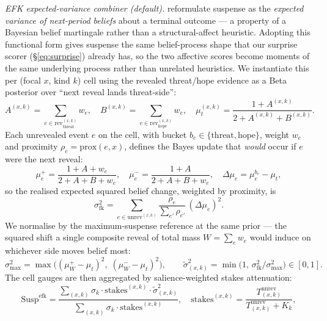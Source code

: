 \documentclass[11pt]{article}
\begin{document}
\emph{EFK expected-variance combiner (default).}
\citet{elyfrankel2015suspense} reformulate suspense as the
\emph{expected variance of next-period beliefs} about a terminal
outcome --- a property of a Bayesian belief martingale rather than a
structural-affect heuristic. Adopting this functional form
gives suspense the same belief-process shape that our surprise
scorer (\S\ref{eq:surprise}) already has, so the two affective
scores become moments of the same underlying process rather than
unrelated heuristics. We instantiate this per (focal $x$, kind
$k$) cell using the revealed threat/hope evidence as a Beta
posterior over ``next reveal lands threat-side'':
\begin{equation}
A^{(x,k)} = \!\!\sum_{e\in\mathrm{rev}^{(x,k)}_{\mathrm{threat}}}\!\! w_e, \quad
B^{(x,k)} = \!\!\sum_{e\in\mathrm{rev}^{(x,k)}_{\mathrm{hope}}}\!\! w_e, \quad
\mu_t^{(x,k)} = \frac{1+A^{(x,k)}}{2+A^{(x,k)}+B^{(x,k)}}.
\end{equation}
Each unrevealed event $e$ on the cell, with bucket
$b_e\in\{\mathrm{threat},\mathrm{hope}\}$, weight $w_e$ and
proximity $\rho_e=\mathrm{prox}(e,x)$, defines the Bayes update
that \emph{would} occur if $e$ were the next reveal:
\begin{equation}
\mu_e^+ = \frac{1+A+w_e}{2+A+B+w_e}, \quad
\mu_e^- = \frac{1+A}{2+A+B+w_e}, \quad
\Delta\mu_e = \mu_e^{b_e} - \mu_t,
\end{equation}
so the realised expected squared belief change, weighted by
proximity, is
\begin{equation}
\sigma^2_{\mathrm{fk}} = \sum_{e\in\mathrm{unrev}^{(x,k)}}\!\!\frac{\rho_e}{\sum_{e'}\rho_{e'}}\,(\Delta\mu_e)^2.
\end{equation}
We normalise by the maximum-suspense reference at the same
prior --- the squared shift a single composite reveal of total
mass $W=\sum_e w_e$ would induce on whichever side moves belief
most:
\begin{equation}
\sigma^2_{\max} = \max\!\Big( (\mu_W^+ - \mu_t)^2,\; (\mu_W^- - \mu_t)^2 \Big), \qquad
\widetilde{\sigma}^2_{(x,k)} = \min\!\Big(1,\, \sigma^2_{\mathrm{fk}}/\sigma^2_{\max}\Big) \in [0,1].
\end{equation}
The cell gauges are then aggregated by salience-weighted stakes
attenuation:
\begin{equation}
\label{eq:suspense}
\mathrm{Susp}^{\mathrm{efk}} = \frac{\sum_{(x,k)} \sigma_k \cdot \mathrm{stakes}^{(x,k)} \cdot \widetilde{\sigma}^2_{(x,k)}}{\sum_{(x,k)} \sigma_k \cdot \mathrm{stakes}^{(x,k)}}, \quad
\mathrm{stakes}^{(x,k)} = \frac{T^{\mathrm{unrev}}_{(x,k)}}{T^{\mathrm{unrev}}_{(x,k)} + K_k},
\end{equation}
\end{document}
